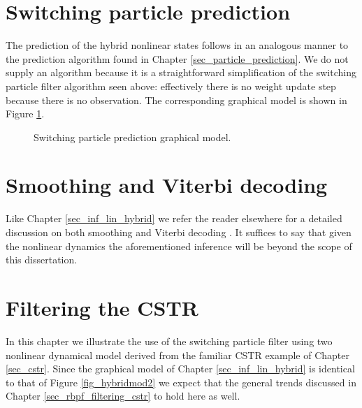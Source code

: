 \section{Switching particle prediction}
The prediction of the hybrid nonlinear states follows in an analogous manner to the prediction algorithm found in Chapter \ref{sec_particle_prediction}. We do not supply an algorithm because it is a straightforward simplification of the switching particle filter algorithm seen above: effectively there is no weight update step because there is no observation. The corresponding graphical model is shown in Figure \ref{fig_hybridmod2_prediction}.
\begin{figure}[H] 
\centering
{}
\caption{Switching particle prediction graphical model.}
\label{fig_hybridmod2_prediction}
\end{figure}  

\section{Smoothing and Viterbi decoding}
Like Chapter \ref{sec_inf_lin_hybrid} we refer the reader elsewhere for a detailed discussion on both smoothing and Viterbi decoding \cite{murphy1}. It suffices to say that given the nonlinear dynamics the aforementioned inference will be beyond the scope of this dissertation. 

\section{Filtering the CSTR}
\label{sec_spf_filtering}
In this chapter we illustrate the use of the switching particle filter using  two nonlinear dynamical model derived from the familiar CSTR example of Chapter \ref{sec_cstr}. Since the graphical model of Chapter \ref{sec_inf_lin_hybrid} is identical to that of Figure \ref{fig_hybridmod2} we expect that the general trends discussed in Chapter \ref{sec_rbpf_filtering_cstr} to hold here as well.


